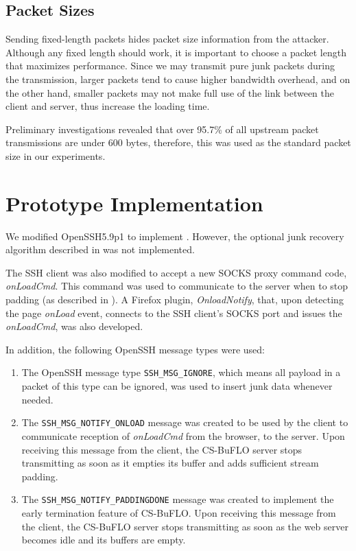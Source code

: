 \documentclass[10pt,journal]{IEEEtran}
\newcommand{\csb} {CS-BuFLO\xspace}
\begin{document}
\subsection{Packet Sizes}
\label{subsubsec:hiding-packet-sizes}
Sending fixed-length packets hides packet size information from the
attacker.  Although any fixed length should work, it is important to
choose a packet length that maximizes performance. Since we may
transmit pure junk packets during the transmission, larger packets
tend to cause higher bandwidth overhead, and on the other hand,
smaller packets may not make full use of the link between the client
and server, thus increase the loading time. 

Preliminary investigations revealed that over 95.7\% of all upstream
packet transmissions are under 600 bytes, therefore, this was used
as the standard packet size in our experiments.


\section{Prototype Implementation}
\label{subsec:implementation}

We modified OpenSSH5.9p1 to implement .
However, the optional junk 
recovery algorithm described in  was not implemented.

The SSH client was also modified to accept a new SOCKS proxy command 
code, \textit{onLoadCmd}. This command was used to communicate to the 
server when to stop padding (as described in ).
A Firefox plugin, \textit{OnloadNotify}, that, upon detecting the page 
\textit{onLoad} event, connects to the SSH client's SOCKS port and issues 
the \textit{onLoadCmd}, was also developed. 

In addition, the following OpenSSH message types were used:
\begin{enumerate}
\item The OpenSSH message type \texttt{SSH\_MSG\_IGNORE}, which means 
all payload in a packet of this type can be ignored, was used 
to insert junk data whenever needed.    
\item The \texttt{SSH\_MSG\_NOTIFY\_ONLOAD} message was created to be
used by the client to communicate reception of \textit{onLoadCmd} from 
the browser, to the server. Upon receiving this message from the client,
the \csb server stops transmitting as soon as it empties its buffer and
adds sufficient stream padding.
\item The \texttt{SSH\_MSG\_NOTIFY\_PADDINGDONE} message was created to 
implement the early termination feature of \csb. Upon receiving this message
from the client, the \csb server stops transmitting as soon as the web 
server becomes idle and its buffers are empty.
\end{enumerate}
\end{document}
